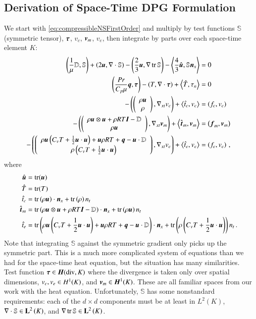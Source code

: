 \documentclass[preprint,12pt]{elsarticle}
\begin{document}
\subsection{Derivation of Space-Time DPG Formulation}
We start with \eqref{eq:compressibleNSFirstOrder} and multiply by test functions $\mathbb{S}$ (symmetric tensor), $\bftau$, $v_c$, $\bfv_m$, $v_e$, 
then integrate by parts over each space-time element $K$:
\begin{subequations}
\label{eq:compressibleNSBF}
\begin{align}
	\LRp{\frac{1}{\mu}\mathbb{D},\mathbb{S}}+\LRp{2\bfu,\Div\mathbb{S}}-\LRp{\frac{2}{3}\bfu,\Grad\trace{\mathbb{S}}}
	-\LRa{\frac{4}{3}\hat\bfu,\mathbb{S}\bfn_x}&=0\\
	\LRp{\frac{Pr}{C_p\mu}\bfq,\bftau}-\LRp{T,\Div\bftau}+\LRa{\hat T,\tau_n}&=0\\
	-\LRp{\vecttwo{\rho\bfu}{\rho},\Gradxt v_c}+\LRa{\hat t_c,v_c}&=\LRp{f_c,v_c}\\
	-\LRp{\vecttwo{\rho\bfu\otimes\bfu+\rho RT\bfI-\mathbb{D}}{\rho\bfu},\Gradxt\bfv_m}+\LRa{\hat\bft_m,\bfv_m}&=\LRp{\bff_m,\bfv_m}\\
	-\LRp{\vecttwo{\rho\bfu\LRp{C_v T+\frac{1}{2}\bfu\cdot\bfu}+\bfu\rho RT+\bfq-\bfu\cdot\mathbb{D}}{\rho\LRp{C_v T+\frac{1}{2}\bfu\cdot\bfu}},\Gradxt v_e}
	+\LRa{\hat t_e,v_e}&=\LRp{f_e,v_e}\,,
\end{align}
\end{subequations}
where 
\begin{equation*}
\begin{aligned}
\hat\bfu&=\trace(\bfu)\\
\hat T&=\trace(T)\\
\hat t_c&=\trace\LRp{\rho\bfu}\cdot\bfn_x
+\trace\LRp{\rho}n_t\\
\hat\bft_m&=\trace\LRp{\rho\bfu\otimes\bfu+\rho RT\bfI-\mathbb{D}}\cdot\bfn_x
+\trace\LRp{\rho\bfu} n_t\\
\hat t_e&=\trace\LRp{\rho\bfu\LRp{C_v T+\frac{1}{2}\bfu\cdot\bfu}+\bfu\rho RT+\bfq-\bfu\cdot\mathbb{D}}\cdot\bfn_x
+\trace\LRp{\rho\LRp{C_v T+\frac{1}{2}\bfu\cdot\bfu}}n_t\,.
\end{aligned}
\end{equation*}
Note that integrating $\mathbb{S}$ against the symmetric gradient only picks up the symmetric part.
This is a much more complicated system of equations than we had for the space-time heat equation, but the situation has many similarities.
Test function $\bftau\in\HdivK$ where the divergence is taken only over spatial dimensions, $v_c,v_e\in\HOneK$, and $\bfv_m\in\HOneVecK$.
These are all familiar spaces from our work with the heat equation.
Unfortunately, $\mathbb{S}$ has some nonstandard requirements: each of the $d\times d$ components must be at least in $L^2(K)$, $\Div\mathbb{S}\in\LVecK$, and
$\Grad\trace{\mathbb{S}}\in\LVecK$.
\end{document}

